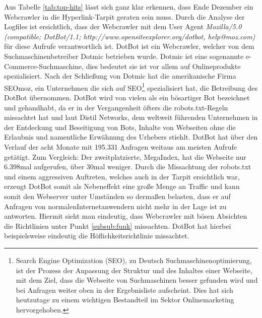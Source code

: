 Aus Tabelle \ref{tab:top-hits} lässt sich ganz klar erkennen, dass Ende Dezember ein Webcrawler in die Hyperlink-Tarpit geraten sein muss. Durch die Analyse der Logfiles ist ersichtlich, dass der Webcrawler mit dem User Agent \emph{Mozilla/5.0 (compatible; DotBot/1.1; http://www.opensiteexplorer.org/dotbot, help@moz.com)} für diese Aufrufe verantwortlich ist. DotBot ist ein Webcrawler, welcher von dem Suchmaschinenbetreiber Dotmic betrieben wurde. Dotmic ist eine sogenannte e-Commerce-Suchmaschine, dies bedeutet sie ist vor allem auf Onlineprodukte spezialisiert\cite{dotmic}. Nach der Schließung von Dotmic hat die amerikanische Firma SEOmoz, ein Unternehmen die sich auf SEO\footnote{Search Engine Optimization (SEO), zu Deutsch Suchmaschinenoptimierung, ist der Prozess der Anpassung der Struktur und des Inhaltes einer Webseite, mit dem Ziel, dass die Webseite von Suchmaschinen besser gefunden wird und bei Anfragen weiter oben in der Ergebnisliste aufscheint. Dies hat sich heutzutage zu einem wichtigen Bestandteil im Sektor Onlinemarketing hervorgehoben.} spezialisiert hat, die Betreibung des DotBot übernommen. DotBot wird von vielen als ein bösartiger Bot bezeichnet und gehandhabt, da er in der Vergangenheit öfters die robots.txt-Regeln missachtet hat und laut Distil Networks, dem weltweit führenden Unternehmen in der Entdeckung und Beseitigung von Bots, Inhalte von Webseiten ohne die Erlaubnis und namentliche Erwähnung des Urhebers stiehlt\cite{dotbot}. DotBot hat über den Verlauf der acht Monate mit 195.331 Anfragen weitaus am meisten Aufrufe getätigt. Zum Vergleich: Der \glqq zweitplatzierte\grqq, MegaIndex, hat die Webseite nur 6.398mal aufgerufen, über 30mal weniger. Durch die Missachtung der robots.txt und einem aggressiven Auftreten, welches auch in der Tarpit ersichtlich war, erzeugt DotBot somit als Nebeneffekt eine große Menge an Traffic und kann somit den Webserver unter Umständen so dermaßen belasten, dass er auf Anfragen von \glqq normalen\grqq\space Internetanwendern nicht mehr in der Lage ist zu antworten. Hiermit sieht man eindeutig, dass Webcrawler mit bösen Absichten die Richtlinien unter Punkt \ref{subsub:funk} missachten. DotBot hat hierbei beispielsweise eindeutig die Höflichkeitsrichtlinie missachtet.
